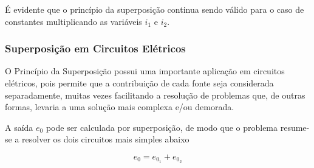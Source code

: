 \documentclass{article}
\numberwithin{equation}{section}
\newlength\Colsep
\begin{document}
É evidente que o princípio da superposição continua sendo válido para o caso de constantes multiplicando as variáveis $i_1$ e $i_2$.

\subsubsection{Superposição em Circuitos Elétricos}
O Princípio da Superposição possui uma importante aplicação em circuitos elétricos, pois permite que a contribuição de cada fonte seja considerada separadamente, muitas vezes facilitando a resolução de problemas que, de outras formas, levaria a uma solução mais complexa e/ou demorada.

\begin{center}
\end{center}

A saída $e_0$ pode ser calculada por superposição, de modo que o problema resume-se a resolver os dois circuitos mais simples abaixo

$$e_0=e_{0_1}+e_{0_2}$$

\noindent\begin{minipage}{\textwidth}
\begin{minipage}[c][5cm][c]{\dimexpr0.5\textwidth-0.5\Colsep\relax}
    \begin{center}
    \end{center}
\end{minipage} \hfill
\begin{minipage}[c][5cm][c]{\dimexpr0.5\textwidth-0.5\Colsep\relax}
    \begin{center}
    \end{center}
\end{minipage}
\end{minipage}
\end{document}

